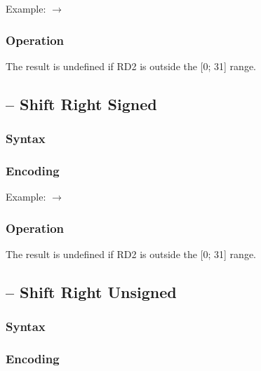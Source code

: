 \documentclass[a4paper,12pt,twoside,extrafontsizes]{memoir}
\begin{document}
{

Example:  $\rightarrow$ 

\subsubsection{Operation}


The result is undefined if RD2 is outside the [0; 31] range.

\subsection{ -- Shift Right Signed}
\label{subsec:instr:srs}

\subsubsection{Syntax}


\subsubsection{Encoding}


Example:  $\rightarrow$ 

\subsubsection{Operation}


The result is undefined if RD2 is outside the [0; 31] range.

\subsection{ -- Shift Right Unsigned}
\label{subsec:instr:sru}

\subsubsection{Syntax}


\subsubsection{Encoding}

}
\end{document}

